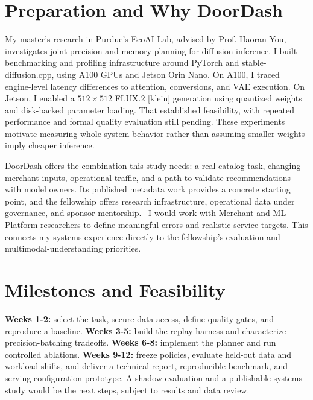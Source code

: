 \documentclass{article}
\begin{document}
\section{Preparation and Why DoorDash}
My master's research in Purdue's EcoAI Lab, advised by Prof. Haoran You, investigates joint precision and memory planning for diffusion inference. I built benchmarking and profiling infrastructure around PyTorch and stable-diffusion.cpp, using A100 GPUs and Jetson Orin Nano. On A100, I traced engine-level latency differences to attention, conversions, and VAE execution. On Jetson, I enabled a $512\times512$ FLUX.2 [klein] generation using quantized weights and disk-backed parameter loading. That established feasibility, with repeated performance and formal quality evaluation still pending. These experiments motivate measuring whole-system behavior rather than assuming smaller weights imply cheaper inference.

DoorDash offers the combination this study needs: a real catalog task, changing merchant inputs, operational traffic, and a path to validate recommendations with model owners. Its published metadata work provides a concrete starting point, and the fellowship offers research infrastructure, operational data under governance, and sponsor mentorship.~\citep{doordashMetadata2026,doordashFellowship2026} I would work with Merchant and ML Platform researchers to define meaningful errors and realistic service targets. This connects my systems experience directly to the fellowship's evaluation and multimodal-understanding priorities.

\section{Milestones and Feasibility}
\textbf{Weeks 1-2:} select the task, secure data access, define quality gates, and reproduce a baseline. \textbf{Weeks 3-5:} build the replay harness and characterize precision-batching tradeoffs. \textbf{Weeks 6-8:} implement the planner and run controlled ablations. \textbf{Weeks 9-12:} freeze policies, evaluate held-out data and workload shifts, and deliver a technical report, reproducible benchmark, and serving-configuration prototype. A shadow evaluation and a publishable systems study would be the next steps, subject to results and data review.
\end{document}
